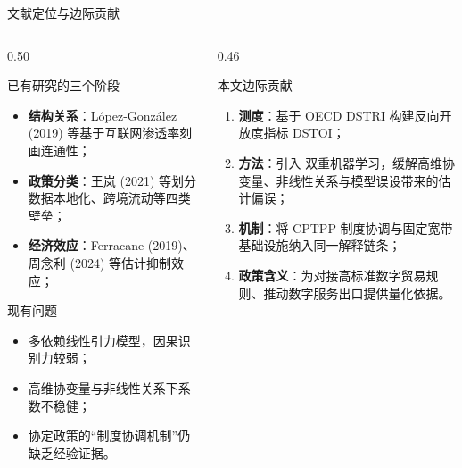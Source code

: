 \documentclass[aspectratio=169,10pt]{ctexbeamer}
\newcommand{\hl}[1]{\textcolor{XJTUBlue}{\textbf{#1}}}
\begin{document}
\begin{frame}{文献定位与边际贡献}
  \begin{columns}[T,totalwidth=\textwidth]
    \begin{column}{0.50\textwidth}
      \begin{block}{已有研究的三个阶段}
        \begin{itemize}
          \item \hl{结构关系}：López-González (2019) 等基于互联网渗透率刻画连通性；
          \item \hl{政策分类}：王岚 (2021) 等划分数据本地化、跨境流动等四类壁垒；
          \item \hl{经济效应}：Ferracane (2019)、周念利 (2024) 等估计抑制效应；
        \end{itemize}
      \end{block}
      \begin{block}{现有问题}
        \begin{itemize}
          \item 多依赖线性引力模型，因果识别力较弱；
          \item 高维协变量与非线性关系下系数不稳健；
          \item 协定政策的“制度协调机制”仍缺乏经验证据。
        \end{itemize}
      \end{block}
    \end{column}
    \begin{column}{0.46\textwidth}
      \begin{block}{本文边际贡献}
        \begin{enumerate}
          \item \hl{测度}：基于 OECD DSTRI 构建反向开放度指标 DSTOI；
          \item \hl{方法}：引入 \alert{双重机器学习}，缓解高维协变量、非线性关系与模型误设带来的估计偏误；
          \item \hl{机制}：将 CPTPP 制度协调与固定宽带基础设施纳入同一解释链条；
          \item \hl{政策含义}：为对接高标准数字贸易规则、推动数字服务出口提供量化依据。
        \end{enumerate}
      \end{block}
    \end{column}
  \end{columns}
\end{frame}
\end{document}
